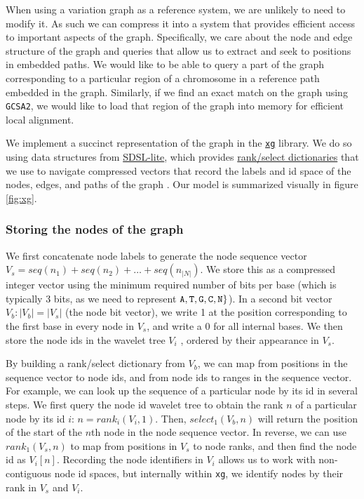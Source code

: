 \documentclass[12pt]{article}
\begin{document}
When using a variation graph as a reference system, we are unlikely to need to modify it.
As such we can compress it into a system that provides efficient access to important aspects of the graph.
Specifically, we care about the node and edge structure of the graph and queries that allow us to extract and seek to positions in embedded paths.
We would like to be able to query a part of the graph corresponding to a particular region of a chromosome in a reference path embedded in the graph.
Similarly, if we find an exact match on the graph using {\tt GCSA2}, we would like to load that region of the graph into memory for efficient local alignment.

We implement a succinct representation of the graph in the \href{https://github.com/vgteam/xg}{{\tt xg}} library.
We do so using data structures from \href{https://github.com/simongog/sdsl-lite}{SDSL-lite}, which provides \href{https://en.wikipedia.org/wiki/Succinct_data_structure#Succinct_dictionaries}{rank/select dictionaries} that we use to navigate compressed vectors that record the labels and id space of the nodes, edges, and paths of the graph \cite{okanohara2007}.
Our model is summarized visually in figure \ref{fig:xg}.

\subsubsection{Storing the nodes of the graph}

We first concatenate node labels to generate the node sequence vector $V_s = seq(n_1) + seq(n_2) + \ldots + seq(n_{|N|})$.
We store this as a compressed integer vector using the minimum required number of bits per base (which is typically 3 bits, as we need to represent ${\tt A, T, G, C, N} \}$).
In a second bit vector $V_b : |V_b| = |V_s|$ (the node bit vector), we write 1 at the position corresponding to the first base in every node in $V_s$, and write a 0 for all internal bases.
We then store the node ids in the wavelet tree $V_i$ \cite{grossi2003high}, ordered by their appearance in $V_s$.

By building a rank/select dictionary from $V_b$, we can map from positions in the sequence vector to node ids, and from node ids to ranges in the sequence vector.
For example, we can look up the sequence of a particular node by its id in several steps.
We first query the node id wavelet tree to obtain the rank $n$ of a particular node by its id $i$: $n = rank_{i}(V_i, 1)$.
Then, $select_1(V_b, n)$ will return the position of the start of the $n$th node in the node sequence vector.
In reverse, we can use $rank_1(V_s, n)$ to map from positions in $V_s$ to node ranks, and then find the node id as $V_i[n]$.
Recording the node identifiers in $V_i$ allows us to work with non-contiguous node id spaces, but internally within {\tt xg}, we identify nodes by their rank in $V_s$ and $V_i$.
\end{document}
